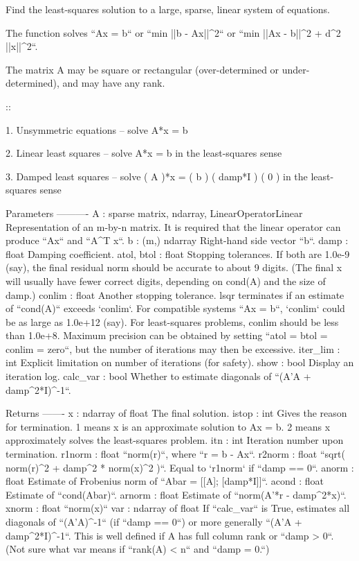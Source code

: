\begin{DoxyVerb}Find the least-squares solution to a large, sparse, linear system
of equations.

The function solves ``Ax = b``  or  ``min ||b - Ax||^2`` or
``min ||Ax - b||^2 + d^2 ||x||^2``.

The matrix A may be square or rectangular (over-determined or
under-determined), and may have any rank.

::

  1. Unsymmetric equations --    solve  A*x = b

  2. Linear least squares  --    solve  A*x = b
                                 in the least-squares sense

  3. Damped least squares  --    solve  (   A    )*x = ( b )
                                        ( damp*I )     ( 0 )
                                 in the least-squares sense

Parameters
----------
A : {sparse matrix, ndarray, LinearOperatorLinear}
    Representation of an m-by-n matrix.  It is required that
    the linear operator can produce ``Ax`` and ``A^T x``.
b : (m,) ndarray
    Right-hand side vector ``b``.
damp : float
    Damping coefficient.
atol, btol : float
    Stopping tolerances. If both are 1.0e-9 (say), the final
    residual norm should be accurate to about 9 digits.  (The
    final x will usually have fewer correct digits, depending on
    cond(A) and the size of damp.)
conlim : float
    Another stopping tolerance.  lsqr terminates if an estimate of
    ``cond(A)`` exceeds `conlim`.  For compatible systems ``Ax =
    b``, `conlim` could be as large as 1.0e+12 (say).  For
    least-squares problems, conlim should be less than 1.0e+8.
    Maximum precision can be obtained by setting ``atol = btol =
    conlim = zero``, but the number of iterations may then be
    excessive.
iter_lim : int
    Explicit limitation on number of iterations (for safety).
show : bool
    Display an iteration log.
calc_var : bool
    Whether to estimate diagonals of ``(A'A + damp^2*I)^{-1}``.

Returns
-------
x : ndarray of float
    The final solution.
istop : int
    Gives the reason for termination.
    1 means x is an approximate solution to Ax = b.
    2 means x approximately solves the least-squares problem.
itn : int
    Iteration number upon termination.
r1norm : float
    ``norm(r)``, where ``r = b - Ax``.
r2norm : float
    ``sqrt( norm(r)^2  +  damp^2 * norm(x)^2 )``.  Equal to `r1norm` if
    ``damp == 0``.
anorm : float
    Estimate of Frobenius norm of ``Abar = [[A]; [damp*I]]``.
acond : float
    Estimate of ``cond(Abar)``.
arnorm : float
    Estimate of ``norm(A'*r - damp^2*x)``.
xnorm : float
    ``norm(x)``
var : ndarray of float
    If ``calc_var`` is True, estimates all diagonals of
    ``(A'A)^{-1}`` (if ``damp == 0``) or more generally ``(A'A +
    damp^2*I)^{-1}``.  This is well defined if A has full column
    rank or ``damp > 0``.  (Not sure what var means if ``rank(A)
    < n`` and ``damp = 0.``)


\end{DoxyVerb}
